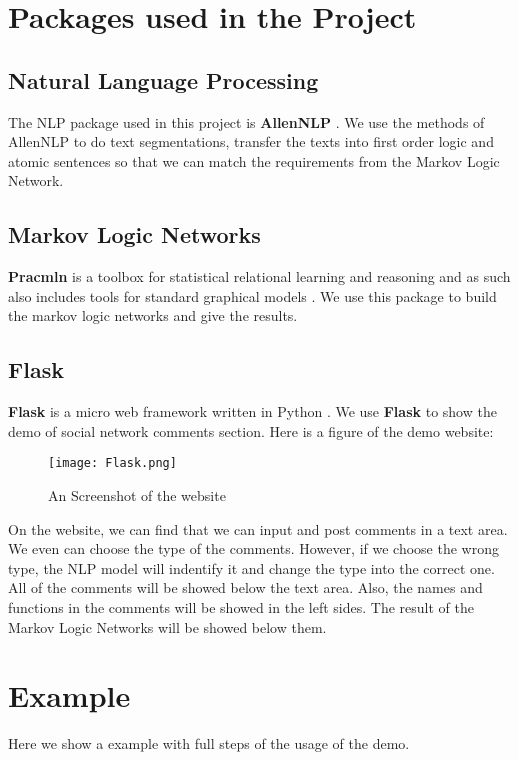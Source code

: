 \documentclass[
12pt, %
a4paper, %
oneside, %
headinclude,footinclude, %
BCOR5mm, %
]{scrartcl}
\begin{document}
\section{Packages used in the Project}
\subsection{Natural Language Processing}
The NLP package used in this project is \textbf{AllenNLP} \cite{Gardner2017AllenNLP}. We use the methods of AllenNLP to do text segmentations, transfer the texts into first order logic and atomic sentences so that we can match the requirements from the Markov Logic Network.

\subsection{Markov Logic Networks}
\textbf{Pracmln} is a toolbox for statistical relational learning and reasoning and as such also includes tools for standard graphical models \cite{pracmln}. We use this package to build the markov logic networks and give the results.
\subsection{Flask}
\textbf{Flask} is a micro web framework written in Python 
\cite{grinberg2018flask}. We use \textbf{Flask} to show the demo of social network comments section. Here is a figure of the demo website:
\begin{figure}[htb]
    \centering 
    \texttt{[image: Flask.png]} 
    \caption[An Screenshot of the website]{An Screenshot of the website} %
    \end{figure}


On the website, we can find that we can input and post comments in a text area. We even can choose the type of the comments. However, if we choose the wrong type, the NLP model will indentify it and change the type into the correct one. All of the comments will be showed below the text area. Also, the names and functions in the comments will be showed in the left sides. The result of the Markov Logic Networks will be showed below them.

\section{Example}
Here we show a example with full steps of the usage of the demo. 
\end{document}
